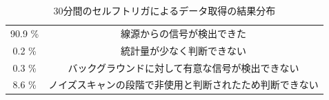 \begin{table}[h]
  \centering
  \caption{30分間のセルフトリガによるデータ取得の結果分布}
  \label{tab:selfconc}
  \begin{tabular}{cc} \hline
    90.9 \% & 線源からの信号が検出できた \\
    0.2 \% & 統計量が少なく判断できない \\
    0.3 \% & バックグラウンドに対して有意な信号が検出できない \\
    8.6 \% & ノイズスキャンの段階で非使用と判断されたため判断できない \\ \hline
  \end{tabular}
\end{table}

    

